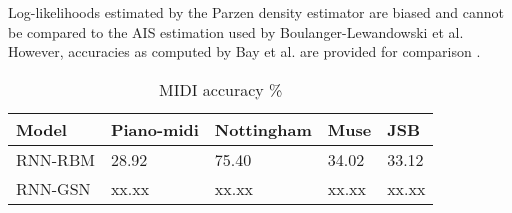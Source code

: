 Log-likelihoods estimated by the Parzen density estimator are biased and cannot be compared to the AIS estimation used by Boulanger-Lewandowski et al. However, accuracies as computed by Bay et al. are provided for comparison \cite{bay}.

\begin {table}[H]
 \caption {MIDI accuracy \%} \label{tab:midi}
\begin{tabular}{l | l l l l}
\hline
Model & Piano-midi & Nottingham & Muse & JSB\\
\hline
RNN-RBM & 28.92 & 75.40 & 34.02 & 33.12\\
RNN-GSN  & xx.xx  & xx.xx  & xx.xx  & xx.xx
\end{tabular}
\end{table}